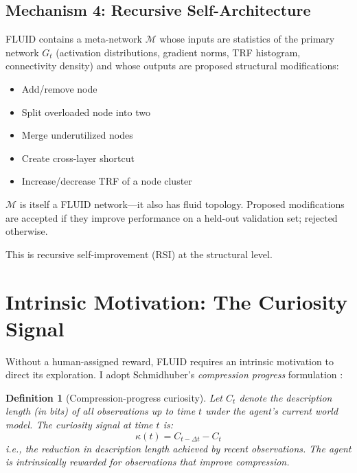 \documentclass[12pt]{article}
\newtheorem{definition}{Definition}
\begin{document}
\subsection{Mechanism 4: Recursive Self-Architecture}

FLUID contains a meta-network $\mathcal{M}$ whose inputs are statistics of the primary network $G_t$ (activation distributions, gradient norms, TRF histogram, connectivity density) and whose outputs are proposed structural modifications:
\begin{itemize}
    \item Add/remove node
    \item Split overloaded node into two
    \item Merge underutilized nodes
    \item Create cross-layer shortcut
    \item Increase/decrease TRF of a node cluster
\end{itemize}

$\mathcal{M}$ is itself a FLUID network---it also has fluid topology. Proposed modifications are accepted if they improve performance on a held-out validation set; rejected otherwise.

This is recursive self-improvement (RSI) at the structural level.

\section{Intrinsic Motivation: The Curiosity Signal}

Without a human-assigned reward, FLUID requires an intrinsic motivation to direct its exploration. I adopt Schmidhuber's \textit{compression progress} formulation \cite{schmidhuber2010}:

\begin{definition}[Compression-progress curiosity]
Let $C_t$ denote the description length (in bits) of all observations up to time $t$ under the agent's current world model. The curiosity signal at time $t$ is:
\begin{equation}
\kappa(t) = C_{t-\Delta t} - C_t
\end{equation}
i.e., the reduction in description length achieved by recent observations. The agent is intrinsically rewarded for observations that improve compression.
\end{definition}
\end{document}
